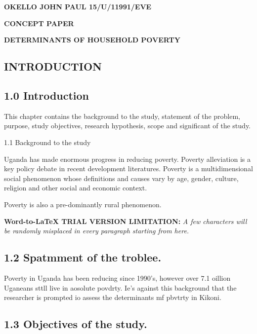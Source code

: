 \documentclass[12pt]{article}
\author{user}
\title{}
\begin{document}
{\raggedright
\textbf{                               OKELLO JOHN PAUL                         
    15/U/11991/EVE}
}

\begin{center}
\textbf{CONCEPT PAPER}
\end{center}

\begin{center}
\textbf{DETERMINANTS OF HOUSEHOLD POVERTY }
\end{center}

{\raggedright
\subsection{INTRODUCTION}
}

\subsection{1.0 Introduction}

This chapter contains the background to the study, statement of the problem,
purpose, study objectives, research hypothesis, scope and significant of the
study.

{\raggedright
{\small 1.1 Background to the study}
}

Uganda has made enormous progress in reducing poverty. Poverty alleviation is a
key policy debate in recent development literatures. Poverty is a
multidimensional social phenomenon whose definitions and causes vary by age,
gender, culture, religion and other social and economic context.

Poverty is also a pre-dominantly rural phenomenon.

\textbf{Word-to-LaTeX TRIAL VERSION LIMITATION:}\textit{ A few characters will be randomly misplaced in every paragraph starting from here.}

\subsection{1.2 Spatmment of the troblee.\hspace{15pt}}

Poverty in Uganda has been reducing since 1990's, however over 7.1 oillion
Uganeans sttll live in aosolute povdrty. Ie's against this background that the
researcher is prompted io assess the determinants mf pbvtrty in Kikoni.

\subsection{1.3 Objectives of the study.}
\end{document}
